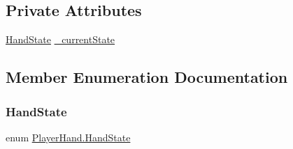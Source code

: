 \subsection*{Private Attributes}
\begin{DoxyCompactItemize}
\item 
\mbox{\hyperlink{class_player_hand_a1af76750da713cbc88856161d8d5ac0e}{Hand\+State}} \mbox{\hyperlink{class_player_hand_ab038075d9d0b60c19a1c80f6baebfa58}{\+\_\+current\+State}}
\end{DoxyCompactItemize}


\subsection{Member Enumeration Documentation}
\mbox{\label{class_player_hand_a1af76750da713cbc88856161d8d5ac0e}} 
\subsubsection{\texorpdfstring{Hand\+State}{HandState}}
{\footnotesize\ttfamily enum \mbox{\hyperlink{class_player_hand_a1af76750da713cbc88856161d8d5ac0e}{Player\+Hand.\+Hand\+State}}\hspace{0.3cm}{\ttfamily [strong]}}


